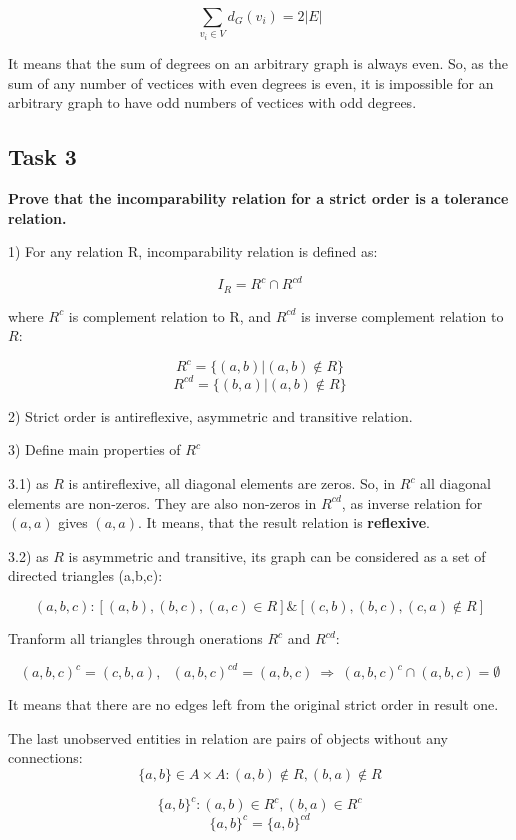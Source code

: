 \[ \sum_{v_i \in V} d_G(v_i) = 2 |E|  \]

It means that the sum of degrees on an arbitrary graph is always even.
So, as the sum of any number of vectices with even degrees is even, it is impossible for an arbitrary graph to have odd numbers of vectices with odd degrees.

\subsection{Task 3}

\begin{center}
\textbf{Prove that the incomparability relation for a strict order is a tolerance relation.}
\end{center}

1) For any relation R, incomparability relation is defined as: 

\[ I_R = R^{c} \cap R^{cd} \]

where $R^c$ is complement relation to R, and $R^{cd}$ is inverse complement relation to $R$:

\[ R^{c} = \{ (a,b) | (a,b) \notin R \} \]
\[ R^{cd} = \{ (b,a) | (a,b) \notin R \} \]

2) Strict order is antireflexive, asymmetric and transitive relation.

3) Define main properties of $R^{c}$

3.1) as $R$ is antireflexive, all diagonal elements are zeros.
So, in $R^{c}$ all diagonal elements are non-zeros. They are also non-zeros in $R^{cd}$, as inverse relation for $(a,a)$ gives $(a,a)$. It means, that the result relation is \textbf{reflexive}.

3.2) as $R$ is asymmetric and transitive, its graph can be considered as a set of directed triangles (a,b,c):

\[ (a,b,c): [(a,b), (b,c), (a,c) \in R] \& [(c,b), (b,c), (c,a) \notin R] \]

Tranform all triangles through onerations $R^{c}$ and $R^{cd}$:

\[ (a,b,c)^{c} = (c,b,a),\ \ \ (a,b,c)^{cd} = (a,b,c) \ \Rightarrow \ (a,b,c)^{c} \cap (a,b,c) = \emptyset \]

It means that there are no edges left from the original strict order in result one.

The last unobserved entities in relation are pairs of objects without any connections:
\[ \{a,b\} \in A \times A: (a,b) \notin R, (b,a) \notin R \]

\[ \{a,b\}^{c}: (a,b) \in R^{c}, (b,a) \in R^{c} \]
\[ \{a,b\}^{c} = \{a,b\}^{cd} \]

